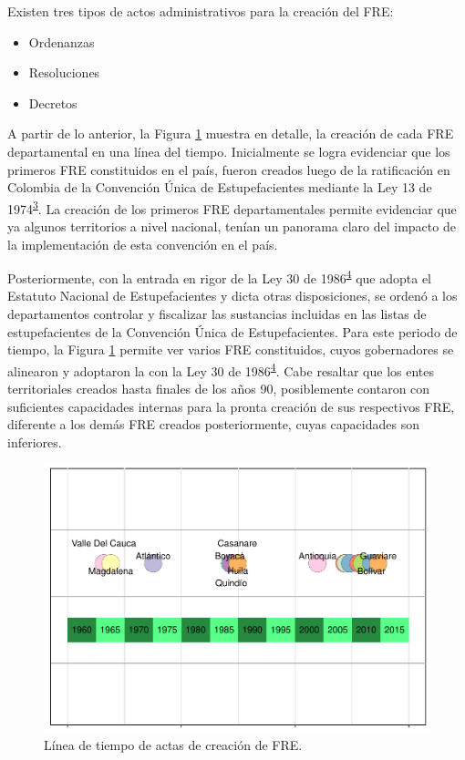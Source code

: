 \documentclass[
]{book}
\providecommand{\tightlist}{%
  \setlength{\itemsep}{0pt}\setlength{\parskip}{0pt}}
\begin{document}
Existen tres tipos de actos administrativos para la creación del FRE:

\begin{itemize}
\tightlist
\item
  Ordenanzas
\item
  Resoluciones
\item
  Decretos
\end{itemize}

A partir de lo anterior, la Figura \ref{fig:serieTiempoCreacion} muestra en detalle, la creación de cada FRE departamental en una línea del tiempo. Inicialmente se logra evidenciar que los primeros FRE constituidos en el país, fueron creados luego de la ratificación en Colombia de la Convención Única de Estupefacientes mediante la Ley 13 de 1974\textsuperscript{\protect\hyperlink{ref-CongresodelaRepublica1974}{3}}. La creación de los primeros FRE departamentales permite evidenciar que ya algunos territorios a nivel nacional, tenían un panorama claro del impacto de la implementación de esta convención en el país.

Posteriormente, con la entrada en rigor de la Ley 30 de 1986\textsuperscript{\protect\hyperlink{ref-CongresodelaRepublicadeColombia1986}{4}} que adopta el Estatuto Nacional de Estupefacientes y dicta otras disposiciones, se ordenó a los departamentos controlar y fiscalizar las sustancias incluidas en las listas de estupefacientes de la Convención Única de Estupefacientes. Para este periodo de tiempo, la Figura \ref{fig:serieTiempoCreacion} permite ver varios FRE constituidos, cuyos gobernadores se alinearon y adoptaron la con la Ley 30 de 1986\textsuperscript{\protect\hyperlink{ref-CongresodelaRepublicadeColombia1986}{4}}. Cabe resaltar que los entes territoriales creados hasta finales de los años 90, posiblemente contaron con suficientes capacidades internas para la pronta creación de sus respectivos FRE, diferente a los demás FRE creados posteriormente, cuyas capacidades son inferiores.

\begin{figure}[h]

{\centering \includegraphics[width=1\linewidth]{InformeFinal_files/figure-latex/serieTiempoCreacion-1} 

}

\caption{Línea de tiempo de actas de creación de FRE.}\label{fig:serieTiempoCreacion}
\end{figure}
\end{document}
